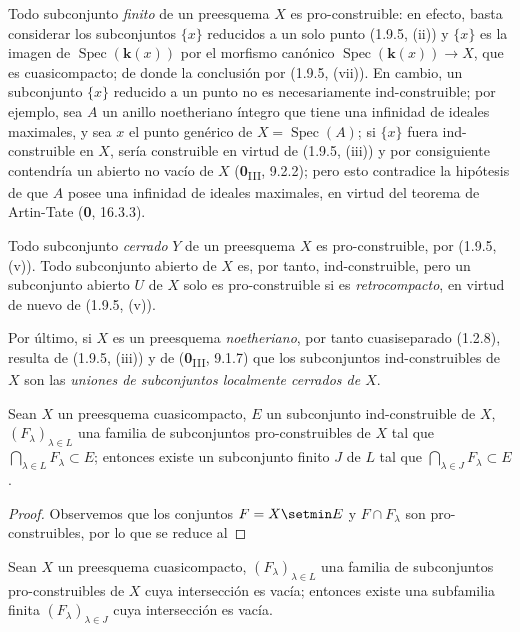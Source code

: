\begin{examples}[1.9.6]
\label{IV.1.9.6-fr}
Todo subconjunto \emph{finito} de un preesquema $X$
es pro-construible: en efecto, basta considerar los subconjuntos
$\{x\}$ reducidos a un solo punto (1.9.5, (ii)) y $\{x\}$ es la imagen de
$\operatorname{Spec}(\boldsymbol{k}(x))$ por el morfismo canónico
$\operatorname{Spec}(\boldsymbol{k}(x))\to X$, que es cuasicompacto; de donde la conclusión
por (1.9.5, (vii)). En cambio, un subconjunto $\{x\}$ reducido a un punto no es
necesariamente ind-construible; por ejemplo, sea $A$ un anillo
noetheriano íntegro que tiene una infinidad de ideales maximales, y sea $x$ el punto
genérico de $X=\operatorname{Spec}(A)$; si $\{x\}$ fuera ind-construible
en $X$, sería construible en virtud de (1.9.5, (iii)) y por consiguiente
contendría un abierto no vacío de $X$ (\textbf{0}\textsubscript{III}, 9.2.2); pero
esto contradice la hipótesis de que $A$ posee una infinidad de ideales maximales, en
virtud del teorema de Artin-Tate (\textbf{0}, 16.3.3).

Todo subconjunto \emph{cerrado} $Y$ de un preesquema $X$ es pro-construible, por
(1.9.5, (v)). Todo subconjunto abierto de $X$ es, por tanto, ind-construible, pero
un subconjunto abierto $U$ de $X$ solo es pro-construible si es
\emph{retrocompacto}, en virtud de nuevo de (1.9.5, (v)).

Por último, si $X$ es un preesquema \emph{noetheriano}, por tanto cuasiseparado (1.2.8),
resulta de (1.9.5, (iii)) y de (\textbf{0}\textsubscript{III}, 9.1.7) que los
subconjuntos ind-construibles de $X$ son las \emph{uniones de subconjuntos
localmente cerrados de $X$}.
\end{examples}

\begin{theorem}[1.9.7]
\label{IV.1.9.7-fr}
Sean $X$ un preesquema cuasicompacto, $E$ un subconjunto ind-construible de
$X$, $(F_\lambda)_{\lambda\in L}$ una familia de subconjuntos pro-construibles
de $X$ tal que $\bigcap_{\lambda\in L}F_\lambda\subset E$; entonces existe
un subconjunto finito $J$ de $L$ tal que
$\bigcap_{\lambda\in J}F_\lambda\subset E$.
\end{theorem}

\begin{proof}
Observemos que los conjuntos $F=X\setmin E$ y $F\cap F_\lambda$ son
pro-construibles, por lo que se reduce al
\end{proof}

\begin{corollary}[1.9.8]
\label{IV.1.9.8-fr}
Sean $X$ un preesquema cuasicompacto, $(F_\lambda)_{\lambda\in L}$ una
familia de subconjuntos pro-construibles de $X$ cuya intersección es vacía;
entonces existe una subfamilia finita $(F_\lambda)_{\lambda\in J}$ cuya
intersección es vacía.
\end{corollary}

